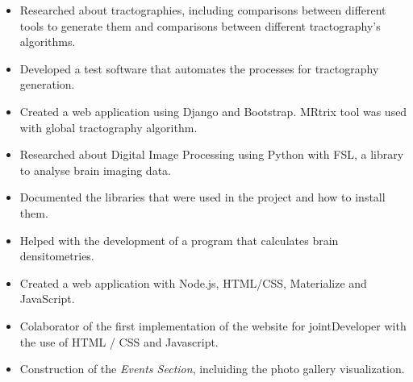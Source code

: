 \documentclass[10pt,a4paper]{altacv}
\begin{document}
\begin{itemize}
\item  Researched about tractographies, including comparisons between different tools to generate them and comparisons between different tractography's algorithms. 

\item Developed a test software that automates the processes for tractography generation. 

\item Created a web application using Django and Bootstrap. MRtrix tool was used with global tractography algorithm.
    
\end{itemize}

\divider

\begin{itemize}

\item Researched about Digital Image Processing using Python with FSL, a library to analyse brain imaging data.

\item Documented the libraries that were used in the project and how to install them.

\item Helped with the development of a program that calculates brain densitometries.

\item Created a web application with Node.js, HTML/CSS, Materialize and JavaScript. 

\end{itemize}


\begin{itemize}

\item Colaborator of the first implementation of the website for jointDeveloper with the use of HTML / CSS and Javascript.

\item Construction of the \textit{Events Section}, incluiding the photo gallery visualization. 
    
\end{itemize}
\end{document}
